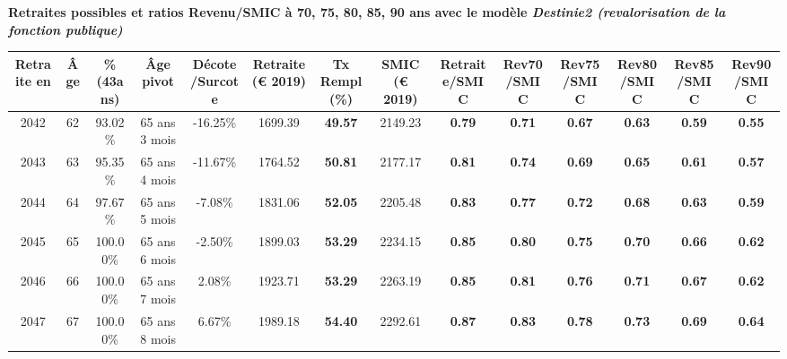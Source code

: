  \vspace{0.1cm} 
{\bf \noindent Retraites possibles et ratios Revenu/SMIC à 70, 75, 80, 85, 90 ans avec le modèle \emph{Destinie2 (revalorisation de la fonction publique)}}  
 
\begin{adjustbox}{max width=\textwidth} 
\begin{tabular}[htb]{|c|c||c|c|c||c|c||c||c|c|c|c|c|c|} 
\hline 
 Retraite en &  Âge &  \%(43ans) &  Âge pivot &  Décote/Surcote &  Retraite (\euro{} 2019) &  Tx Rempl(\%) &  SMIC (\euro{} 2019) &  Retraite/SMIC &  Rev70/SMIC &  Rev75/SMIC &  Rev80/SMIC &  Rev85/SMIC &  Rev90/SMIC \\ 
\hline \hline 
 2042 &  62 &  93.02\% &  65 ans 3 mois &  -16.25\% &  1699.39 &  {\bf 49.57} &  2149.23 &  {\bf {\color{red} 0.79}} &  {\bf {\color{red} 0.71}} &  {\bf {\color{red} 0.67}} &  {\bf {\color{red} 0.63}} &  {\bf {\color{red} 0.59}} &  {\bf {\color{red} 0.55}} \\ 
\hline 
 2043 &  63 &  95.35\% &  65 ans 4 mois &  -11.67\% &  1764.52 &  {\bf 50.81} &  2177.17 &  {\bf {\color{red} 0.81}} &  {\bf {\color{red} 0.74}} &  {\bf {\color{red} 0.69}} &  {\bf {\color{red} 0.65}} &  {\bf {\color{red} 0.61}} &  {\bf {\color{red} 0.57}} \\ 
\hline 
 2044 &  64 &  97.67\% &  65 ans 5 mois &  -7.08\% &  1831.06 &  {\bf 52.05} &  2205.48 &  {\bf {\color{red} 0.83}} &  {\bf {\color{red} 0.77}} &  {\bf {\color{red} 0.72}} &  {\bf {\color{red} 0.68}} &  {\bf {\color{red} 0.63}} &  {\bf {\color{red} 0.59}} \\ 
\hline 
 2045 &  65 &  100.00\% &  65 ans 6 mois &  -2.50\% &  1899.03 &  {\bf 53.29} &  2234.15 &  {\bf {\color{red} 0.85}} &  {\bf {\color{red} 0.80}} &  {\bf {\color{red} 0.75}} &  {\bf {\color{red} 0.70}} &  {\bf {\color{red} 0.66}} &  {\bf {\color{red} 0.62}} \\ 
\hline 
 2046 &  66 &  100.00\% &  65 ans 7 mois &  2.08\% &  1923.71 &  {\bf 53.29} &  2263.19 &  {\bf {\color{red} 0.85}} &  {\bf {\color{red} 0.81}} &  {\bf {\color{red} 0.76}} &  {\bf {\color{red} 0.71}} &  {\bf {\color{red} 0.67}} &  {\bf {\color{red} 0.62}} \\ 
\hline 
 2047 &  67 &  100.00\% &  65 ans 8 mois &  6.67\% &  1989.18 &  {\bf 54.40} &  2292.61 &  {\bf {\color{red} 0.87}} &  {\bf {\color{red} 0.83}} &  {\bf {\color{red} 0.78}} &  {\bf {\color{red} 0.73}} &  {\bf {\color{red} 0.69}} &  {\bf {\color{red} 0.64}} \\ 
\hline 
\hline 
\end{tabular} 
\end{adjustbox} 
 
